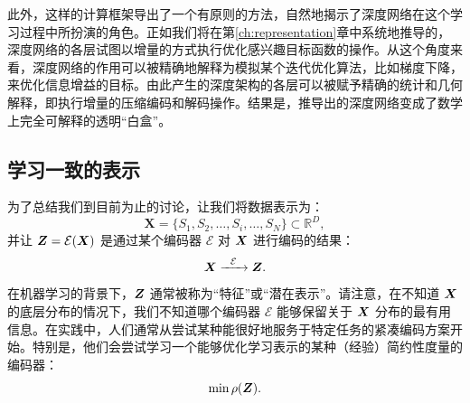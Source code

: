 \documentclass[../../book-main.tex]{subfiles}
\begin{document}
此外，这样的计算框架导出了一个有原则的方法，自然地揭示了深度网络在这个学习过程中所扮演的角色。正如我们将在第\ref{ch:representation}章中系统地推导的，深度网络的各层试图以增量的方式执行优化感兴趣目标函数的操作。从这个角度来看，深度网络的作用可以被精确地解释为模拟某个迭代优化算法，比如梯度下降，来优化信息增益的目标。由此产生的深度架构的各层可以被赋予精确的统计和几何解释，即执行增量的压缩编码和解码操作。结果是，推导出的深度网络变成了数学上完全可解释的透明“白盒”。











\subsection{学习一致的表示}

\label{sec:consistency}
为了总结我们到目前为止的讨论，让我们将数据表示为：
\begin{equation}
    \boldsymbol{X} = \{S_1, S_2, \ldots, S_i, \ldots, S_N\} \subset \mathbb{R}^D,
\end{equation}
并让 $\boldsymbol{Z} = \mathcal{E}(\bm{X})$ 是通过某个编码器 $\mathcal{E}$ 对 $\bm{X}$ 进行编码的结果：
\begin{equation}
    \bm{X}  \xrightarrow{\hspace{2mm} \mathcal{E}\hspace{2mm}} \bm{Z}.
    \label{eqn:open-loop}
\end{equation}
在机器学习的背景下，$\bm{Z}$ 通常被称为“特征”或“潜在表示”。请注意，在不知道 $\bm{X}$ 的底层分布的情况下，我们不知道哪个编码器 $\mathcal{E}$ 能够保留关于 $\bm{X}$ 分布的最有用信息。在实践中，人们通常从尝试某种能很好地服务于特定任务的紧凑编码方案开始。特别是，他们会尝试学习一个能够优化学习表示的某种（经验）简约性度量的编码器：
\begin{equation}
    \min \rho(\bm{Z}). 
\end{equation}
\end{document}
